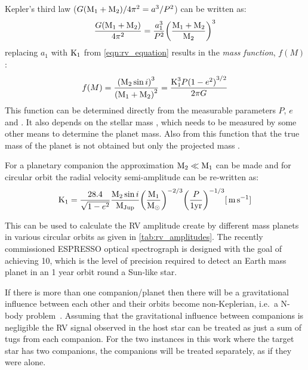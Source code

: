 Kepler's third law (\({G (\mone + \mtwo)}/{4\pi^{2}}= {a}^{3}/{P}^{2}\)) can be written as:
\begin{equation}
    \frac{G (\mone + \mtwo)}{4\pi^{2}} = \frac{a_{1}^{3}}{P^{2}}{\left(\frac{\mone + \mtwo}{\mtwo}\right)}^{3}
\end{equation}
replacing $a_{1}$ with $\kone$ from \cref{eqn:rv_equation} results in the \emph{mass function}, $f(M)$:
\begin{equation}
    f(M) = \frac{{(\mtwosini)}^{3}}{{(\mone + \mtwo)}^{2}} = \frac{\kone^{3} P {(\oneminusetwo)}^{3/2}}{2 \pi G} \label{eqn:mass_function}
\end{equation}
This function can be determined directly from the measurable parameters $P$, $e$ and \Kone{}.
It also depends on the stellar mass \Mone{}, which needs to be measured by some other means to determine the planet mass.
Also from this function that the true mass of the planet \Mtwo{} is not obtained but only the projected mass \Mtwosini{}.

For a planetary companion the approximation $\mtwo \ll \mone$ can be made and for circular orbit the radial velocity semi-amplitude can be re-written as:
\begin{equation}
    \kone = \frac{28.4}{\sqrt{\oneminusetwo}} \frac{\mtwosini}{\mjup} {\left(\frac{\mone}{\modot}\right)}^{-2/3} {\left(\frac{P}{1 \si{yr}}\right)}^{-1/3}  [\mps] \label{eqn:k_relation}
\end{equation}

This can be used to calculate the RV amplitude create by different mass planets in various circular orbits as given in \cref{tab:rv_amplitudes}. The recently commissioned ESPRESSO optical spectrograph is designed with the goal of achieving 10\cmps{}, which is the level of precision required to detect an Earth mass planet in an 1 year orbit round a Sun-like star.



If there is more than one companion/planet then there will be a gravitational influence between each other and their orbits become non-Keplerian, i.e.\ a N-body problem~\citep[e.g.][]{chenciner_three_2007}.
Assuming that the gravitational influence between companions is negligible the RV signal observed in the host star can be treated as just a sum of tugs from each companion.
For the two instances in this work where the target star has two companions, the companions will be treated separately, as if they were alone.


